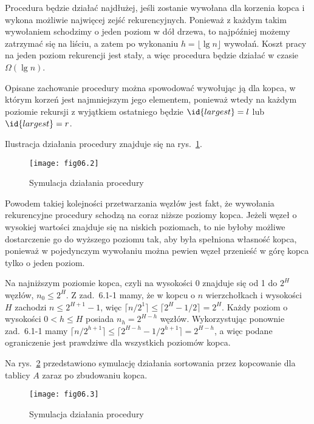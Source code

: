 \exercise %
Procedura  będzie działać najdłużej, jeśli zostanie wywołana dla korzenia kopca i wykona możliwie najwięcej zejść rekurencyjnych. Ponieważ z każdym takim wywołaniem schodzimy o jeden poziom w dół drzewa, to najpóźniej możemy zatrzymać się na liściu, a zatem po wykonaniu $h=\lfloor\lg n\rfloor$ wywołań. Koszt pracy na jeden poziom rekurencji jest stały, a więc procedura będzie działać w czasie $\Omega(\lg n)$.

Opisane zachowanie procedury można spowodować wywołując ją dla kopca, w którym korzeń jest najmniejszym jego elementem, ponieważ wtedy na każdym poziomie rekursji z wyjątkiem ostatniego będzie $\id{largest}=l$ lub $\id{largest}=r$.


\exercise %
Ilustracja działania procedury  znajduje się na rys.~\ref{fig:6.3-1}.
\begin{figure}[ht]
	\begin{center}
		\texttt{[image: fig06.2]}
	\end{center}
	\caption{Symulacja działania procedury } \label{fig:6.3-1}
\end{figure}

\exercise %
Powodem takiej kolejności przetwarzania węzłów jest fakt, że wywołania rekurencyjne procedury  schodzą na coraz niższe poziomy kopca. Jeżeli węzeł o wysokiej wartości znajduje się na niskich poziomach, to nie byłoby możliwe dostarczenie go do wyższego poziomu tak, aby była spełniona własność kopca, ponieważ w pojedynczym wywołaniu  można pewien węzeł przenieść w górę kopca tylko o jeden poziom.

\exercise %
Na najniższym poziomie kopca, czyli na wysokości 0 znajduje się od 1 do $2^H$ węzłów, $n_0\le2^H$. Z zad.~6.1-1 mamy, że w kopcu o $n$ wierzchołkach i wysokości $H$ zachodzi $n\le2^{H+1}-1$, więc $\lceil n/2^1\rceil\le\lceil2^H-1/2\rceil=2^H$. Każdy poziom o wysokości $0<h\le H$ posiada $n_h=2^{H-h}$ węzłów. Wykorzystując ponownie zad.~6.1-1 mamy $\lceil n/2^{h+1}\rceil\le\lceil2^{H-h}-1/2^{h+1}\rceil=2^{H-h}$, a więc podane ograniczenie jest prawdziwe dla wszystkich poziomów kopca.


\exercise %
Na rys.~\ref{fig:6.4-1} przedstawiono symulację działania sortowania przez kopcowanie dla tablicy $A$ zaraz po zbudowaniu kopca.
\begin{figure}[ht]
	\begin{center}
		\texttt{[image: fig06.3]}
	\end{center}
	\caption{Symulacja działania procedury } \label{fig:6.4-1}
\end{figure}

